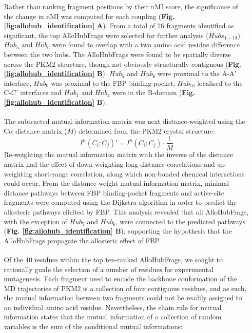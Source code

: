 Rather than ranking fragment positions by their nMI score, the significance of the change in nMI was computed for each coupling (\textbf{Fig. \ref{fig:allohub_identification} A}). From a total of 76 fragments identified as significant, the top AlloHubFrags were selected for further analysis ($Hubs_{1-10}$). $Hub_{5}$ and $Hub_{6}$ were found to overlap with a two amino acid residue difference between the two hubs. The AlloHubFrags were found to be spatially diverse across the PKM2 structure, though not obviously structurally contiguous (\textbf{Fig. \ref{fig:allohub_identification} B}). $Hub_{5}$ and $Hub_{6}$ were proximal to the A-A' interface, $Hub_{9}$ was proximal to the FBP binding pocket, $Hub_{10}$ localised to the C-C' interfaces and $Hub_{1}$ and $Hub_{2}$ were in the B-domain (\textbf{Fig. \ref{fig:allohub_identification} B}).
%
%
\\\\
%
%
The subtracted mutual information matrix was next distance-weighted using the C$\alpha$ distance matrix ($M$) determined from the PKM2 crystal structure:
%
%
\begin{equation}
I^{n}(C_i; C_j)' = I^{n}(C_i; C_j) \cdot \frac{1}{M}
\end{equation}
%
%
Re-weighting the mutual information matrix with the inverse of the distance matrix had the effect of down-weighting long-distance correlations and up-weighting short-range correlation, along which non-bonded chemical interactions could occur. From the distance-weight mutual information matrix, minimal distance pathways between FBP binding-pocket fragments and active-site fragments were computed using the Dijkstra algorithm in order to predict the allosteric pathways elicited by FBP. This analysis revealed that all AlloHubFrags, with the exception of $Hub_5$ and $Hub_6$, were connected to the predicted pathways (\textbf{Fig. \ref{fig:allohub_identification} B}), supporting the hypothesis that the AlloHubFrags propagate the allosteric effect of FBP.
%
%
\\\\
%
%
Of the 40 residues within the top ten-ranked AlloHubFrags, we sought to rationally guide the selection of a number of residues for experimental mutagenesis. Each fragment used to encode the backbone conformation of the MD trajectories of PKM2 is a collection of four contiguous residues, and as such, the mutual information between two fragments could not be readily assigned to an individual amino acid residue. Nevertheless, the chain rule for mutual information states that the mutual information of a collection of random variables is the sum of the conditional mutual informations:

